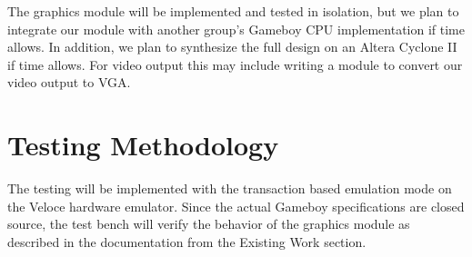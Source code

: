 \documentclass{article}
\begin{document}
The graphics module will be implemented and tested in isolation, 
but we plan to integrate our module with another group's Gameboy CPU 
implementation if time allows.  In addition, we plan to synthesize
the full design on an Altera Cyclone II if time allows.
For video output this may include writing a module to convert our 
video output to VGA.


\section{Testing Methodology}
The testing will be implemented with the transaction based
emulation mode on the Veloce hardware emulator. Since the 
actual Gameboy specifications are closed source, the test 
bench will verify the behavior of the graphics module as
described in the documentation from the Existing Work 
section.
\end{document}
